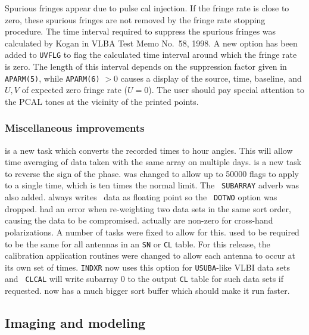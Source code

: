 Spurious fringes appear due to pulse cal injection.  If the fringe
rate is close to zero, these spurious fringes are not removed by the
fringe rate stopping procedure.  The time interval required to
suppress the spurious fringes was calculated by Kogan in VLBA Test
Memo No.~58, 1998.  A new option has been added to {\tt UVFLG} to flag
the calculated time interval around which the fringe rate is zero.
The length of this interval depends on the suppression factor given in
{\tt APARM(5)}, while {\tt APARM(6)} $>0$ causes a display of the
source, time, baseline, and $U,V$ of expected zero fringe rate ($U=0$).
The user should pay special attention to the PCAL tones at the
vicinity of the printed points.

\subsubsection{Miscellaneous improvements}

\begin{description}
 is a new task which converts the recorded times to hour
   angles.  This will allow time averaging of data taken with the same
   array on multiple days.
 is a new task to reverse the sign of the phase.
 was changed to allow up to 50000 flags to apply to a
   single time, which is ten times the normal limit.  The {\tt
   SUBARRAY} adverb was also added.
 always writes \uv\ data as floating point so the {\tt
   DOTWO} option was dropped.
 had an error when re-weighting two data sets in the
   same sort order, causing the data to be compromised.
 \hspace{70pt} actually are non-zero for
   cross-hand polarizations.  A number of tasks were fixed to allow
   for this.
 \hspace{45pt} used to be required to be the
   same for all antennas in an {\tt SN} or {\tt CL} table.  For this
   release, the calibration application routines were changed to allow
   each antenna to occur at its own set of times.  {\tt INDXR} now
   uses this option for {\tt USUBA}-like VLBI data sets and {\tt
   CLCAL} will write subarray 0 to the output {\tt CL} table for such
   data sets if requested.
 now has a much bigger sort buffer which should make it
   run faster.
\end{description}

\subsection{Imaging and modeling}

